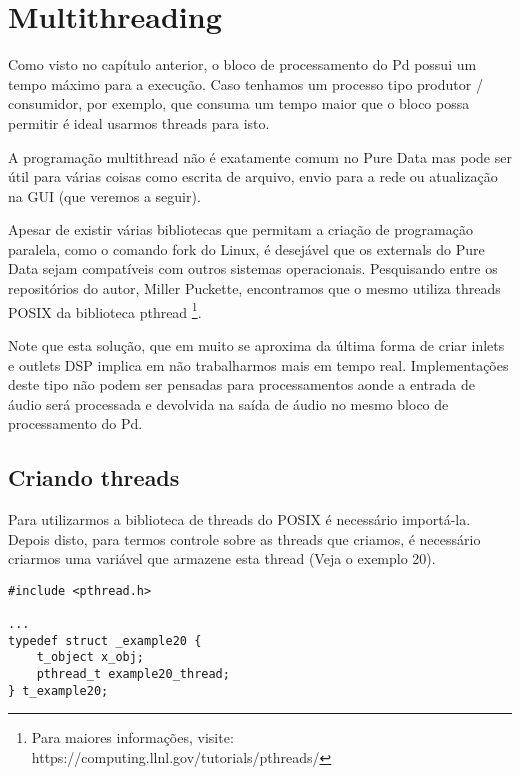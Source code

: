 
\chapter{Multithreading}

Como visto no capítulo anterior, o bloco de processamento do Pd possui um tempo máximo para
a execução. Caso tenhamos um processo tipo produtor / consumidor, por exemplo, que consuma
um tempo maior que o bloco possa permitir é ideal usarmos threads para isto.

A programação multithread não é exatamente comum no Pure Data mas pode ser útil para várias
coisas como escrita de arquivo, envio para a rede ou atualização na GUI (que veremos a seguir).

Apesar de existir várias bibliotecas que permitam a criação de programação paralela, como o 
comando fork do Linux, é desejável que os externals do Pure Data sejam compatíveis com outros
sistemas operacionais. Pesquisando entre os repositórios do autor, Miller Puckette, encontramos
que o mesmo utiliza threads POSIX da biblioteca pthread \footnote{Para maiores informações, visite:
 https://computing.llnl.gov/tutorials/pthreads/}.

Note que esta solução, que em muito se aproxima da última forma de criar inlets e outlets DSP
implica em não trabalharmos mais em tempo real. Implementações deste tipo não podem ser pensadas
para processamentos aonde a entrada de áudio será processada e devolvida na saída de áudio no
mesmo bloco de processamento do Pd.

\section{Criando threads}

Para utilizarmos a biblioteca de threads do POSIX é necessário importá-la. Depois disto, para 
termos controle sobre as threads que criamos, é necessário criarmos uma variável
que armazene esta thread (Veja o exemplo 20).

\begin{lstlisting}
#include <pthread.h>

...
typedef struct _example20 {
    t_object x_obj;
    pthread_t example20_thread;
} t_example20;

\end{lstlisting}

